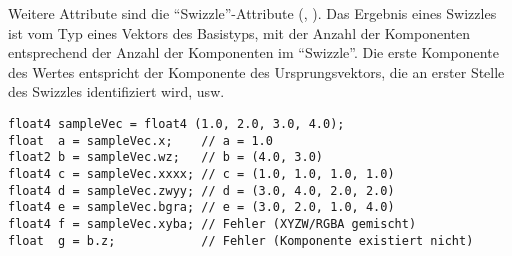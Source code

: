 Weitere Attribute sind die "`Swizzle"'-Attribute (, ).
Das Ergebnis eines Swizzles ist vom Typ eines Vektors des Basistyps, mit der Anzahl der Komponenten
entsprechend der Anzahl der Komponenten im "`Swizzle"'. Die erste Komponente des Wertes entspricht
der Komponente des Ursprungsvektors, die an erster Stelle des Swizzles identifiziert wird, usw.

\begin{lstlisting}[basicstyle=\ttfamily\small,lineskip=-11pt]
float4 sampleVec = float4 (1.0, 2.0, 3.0, 4.0);
float  a = sampleVec.x;    // a = 1.0
float2 b = sampleVec.wz;   // b = (4.0, 3.0)
float4 c = sampleVec.xxxx; // c = (1.0, 1.0, 1.0, 1.0)
float4 d = sampleVec.zwyy; // d = (3.0, 4.0, 2.0, 2.0)
float4 e = sampleVec.bgra; // e = (3.0, 2.0, 1.0, 4.0)
float4 f = sampleVec.xyba; // Fehler (XYZW/RGBA gemischt)
float  g = b.z;            // Fehler (Komponente existiert nicht)
\end{lstlisting}


